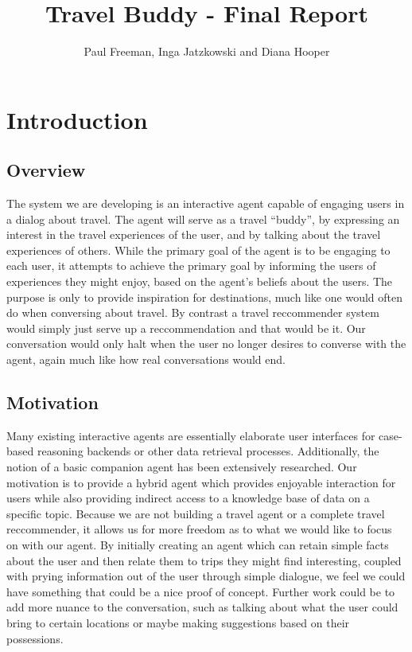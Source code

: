 \documentclass[11pt]{article} %
\title{Travel Buddy - Final Report}
\author{Paul Freeman, Inga Jatzkowski and Diana Hooper}
\begin{document}
\maketitle
\newpage
\section{Introduction}
\subsection{Overview}
The system we are developing is an interactive agent capable of
engaging users in a dialog about travel. The agent will serve as
a travel ``buddy'', by expressing an interest in the travel
experiences of the user, and by talking about the travel
experiences of others. While the primary goal of the agent is
to be engaging to each user, it attempts to achieve the primary
goal by informing the users of experiences they might enjoy,
based on the agent’s beliefs about the users. The purpose is only to provide inspiration for destinations, much like one would often do when conversing about travel. By contrast a travel reccommender system would simply just serve up a reccommendation and that would be it. Our conversation would only halt when the user no longer desires to converse with the agent, again much like how real conversations would end.

\subsection{Motivation}
Many existing interactive agents are essentially elaborate user
interfaces for case-based reasoning backends or other data retrieval
processes. Additionally, the notion of a basic companion agent has been
extensively researched. Our motivation is to provide a hybrid agent
which provides enjoyable interaction for users while also providing
indirect access to a knowledge base of data on a specific topic.
Because we are not building a travel agent or a complete travel reccommender,
it allows us for more freedom as to what we would like to focus on with our agent. By initially 
creating an agent which can retain simple facts about the user and then relate them to trips 
they might find interesting, coupled with prying information out of the user through simple dialogue, we feel we could have something
that could be a nice proof of concept. Further work could be to add more nuance to the conversation, such as talking about what the user could bring to certain locations or maybe making suggestions based on their possessions.
\end{document}
